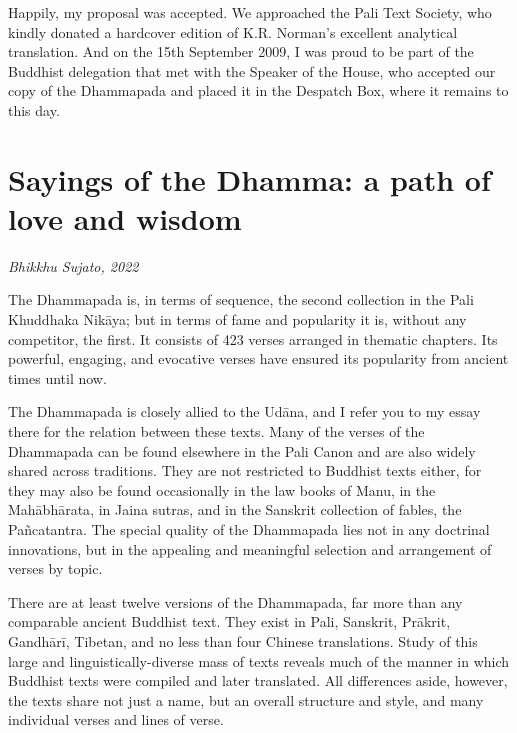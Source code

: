 \documentclass[12pt,openany]{book}%
\newcommand*{\scbyline}[1]{\begin{flushright}\textit{#1}\end{flushright}\bigskip}
\begin{document}
Happily, my proposal was accepted. We approached the Pali Text Society, who kindly donated a hardcover edition of K.R. Norman’s excellent analytical translation. And on the 15th September 2009, I was proud to be part of the Buddhist delegation that met with the Speaker of the House, who accepted our copy of the Dhammapada and placed it in the Despatch Box, where it remains to this day.

%
\chapter*{Sayings of the Dhamma: a path of love and wisdom}

\scbyline{Bhikkhu Sujato, 2022}

The Dhammapada is, in terms of sequence, the second collection in the Pali Khuddhaka \textsanskrit{Nikāya}; but in terms of fame and popularity it is, without any competitor, the first. It consists of 423 verses arranged in thematic chapters. Its powerful, engaging, and evocative verses have ensured its popularity from ancient times until now.

The Dhammapada is closely allied to the \textsanskrit{Udāna}, and I refer you to my essay there for the relation between these texts. Many of the verses of the Dhammapada can be found elsewhere in the Pali Canon and are also widely shared across traditions. They are not restricted to Buddhist texts either, for they may also be found occasionally in the law books of Manu, in the \textsanskrit{Mahābhārata}, in Jaina sutras, and in the Sanskrit collection of fables, the \textsanskrit{Pañcatantra}. The special quality of the Dhammapada lies not in any doctrinal innovations, but in the appealing and meaningful selection and arrangement of verses by topic.

There are at least twelve versions of the Dhammapada, far more than any comparable ancient Buddhist text. They exist in Pali, Sanskrit, \textsanskrit{Prākrit}, \textsanskrit{Gandhārī}, Tibetan, and no less than four Chinese translations. Study of this large and linguistically-diverse mass of texts reveals much of the manner in which Buddhist texts were compiled and later translated. All differences aside, however, the texts share not just a name, but an overall structure and style, and many individual verses and lines of verse.
\end{document}
